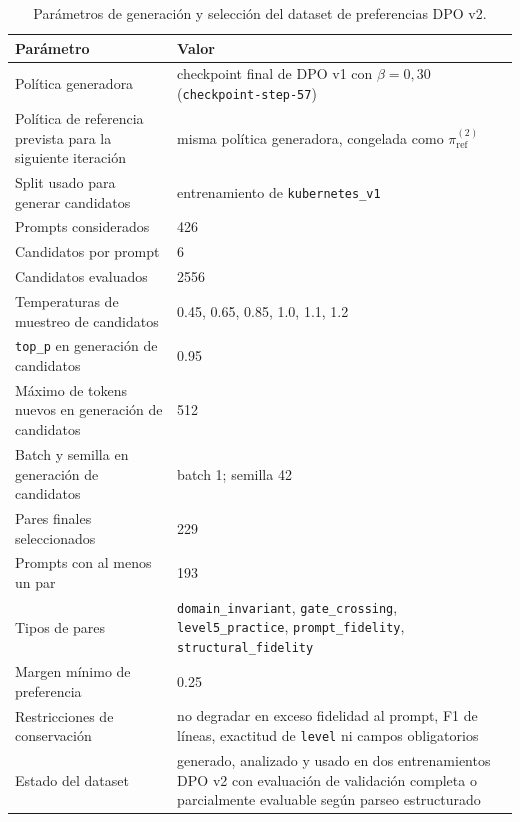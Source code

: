 \begin{table}[htbp]
\centering
\caption{Parámetros de generación y selección del dataset de preferencias DPO v2.}
\label{tab:AnexoA_dpo_v2_dataset}
\begin{tabularx}{\textwidth}{p{}X}
\toprule
\textbf{Parámetro} & \textbf{Valor} \\
\midrule
Política generadora & checkpoint final de DPO v1 con \(\beta=0{,}30\) (\texttt{checkpoint-step-57}) \\
Política de referencia prevista para la siguiente iteración & misma política generadora, congelada como \(\pi_{\mathrm{ref}}^{(2)}\) \\
Split usado para generar candidatos & entrenamiento de \texttt{kubernetes\_v1} \\
Prompts considerados & 426 \\
Candidatos por prompt & 6 \\
Candidatos evaluados & 2556 \\
Temperaturas de muestreo de candidatos & 0.45, 0.65, 0.85, 1.0, 1.1, 1.2 \\
\texttt{top\_p} en generación de candidatos & 0.95 \\
Máximo de tokens nuevos en generación de candidatos & 512 \\
Batch y semilla en generación de candidatos & batch 1; semilla 42 \\
Pares finales seleccionados & 229 \\
Prompts con al menos un par & 193 \\
Tipos de pares & \texttt{domain\_invariant}, \texttt{gate\_crossing}, \texttt{level5\_practice}, \texttt{prompt\_fidelity}, \texttt{structural\_fidelity} \\
Margen mínimo de preferencia & 0.25 \\
Restricciones de conservación & no degradar en exceso fidelidad al prompt, F1 de líneas, exactitud de \texttt{level} ni campos obligatorios \\
Estado del dataset & generado, analizado y usado en dos entrenamientos DPO v2 con evaluación de validación completa o parcialmente evaluable según parseo estructurado \\
\bottomrule
\end{tabularx}
\end{table}

